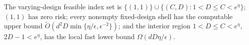 The varying-design feasible index set is \(\{(1,1)\}\cup\{(C,D):1<D\le C<e^\eta\}\); \((1,1)\) has zero risk; every nonempty fixed-design shell has the computable upper bound \(\widetilde O(d^2D\min\{\eta/\epsilon,\epsilon^{-2}\})\); and the interior region \(1<D\le C<e^\eta\), \(2D-1<e^\eta\), has the local fast lower bound \(\Omega(dD\eta/\epsilon)\).